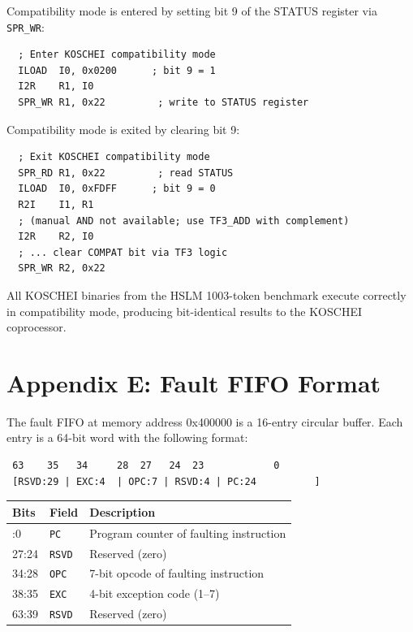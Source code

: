 Compatibility mode is entered by setting bit 9 of the STATUS
register via \texttt{SPR\_WR}:

\begin{verbatim}
  ; Enter KOSCHEI compatibility mode
  ILOAD  I0, 0x0200      ; bit 9 = 1
  I2R    R1, I0
  SPR_WR R1, 0x22         ; write to STATUS register
\end{verbatim}

Compatibility mode is exited by clearing bit 9:

\begin{verbatim}
  ; Exit KOSCHEI compatibility mode
  SPR_RD R1, 0x22         ; read STATUS
  ILOAD  I0, 0xFDFF      ; bit 9 = 0
  R2I    I1, R1
  ; (manual AND not available; use TF3_ADD with complement)
  I2R    R2, I0
  ; ... clear COMPAT bit via TF3 logic
  SPR_WR R2, 0x22
\end{verbatim}

All KOSCHEI binaries from the HSLM 1003-token benchmark execute
correctly in compatibility mode, producing bit-identical results
to the KOSCHEI coprocessor.

\section{Appendix E: Fault FIFO Format}\label{fa_71:appx-fault-fifo}

The fault FIFO at memory address 0x400000 is a 16-entry circular
buffer. Each entry is a 64-bit word with the following format:

\begin{verbatim}
 63    35   34     28  27   24  23            0
 [RSVD:29 | EXC:4  | OPC:7 | RSVD:4 | PC:24          ]
\end{verbatim}

\begin{longtable}[]{@{}llp{6cm}@{}}
\toprule\noalign{}
Bits & Field & Description \\
\midrule\noalign{}
\endhead
\bottomrule\noalign{}
\endlastfoot
23:0 & \texttt{PC} & Program counter of faulting instruction \\
27:24 & \texttt{RSVD} & Reserved (zero) \\
34:28 & \texttt{OPC} & 7-bit opcode of faulting instruction \\
38:35 & \texttt{EXC} & 4-bit exception code (1--7) \\
63:39 & \texttt{RSVD} & Reserved (zero) \\
\end{longtable}

